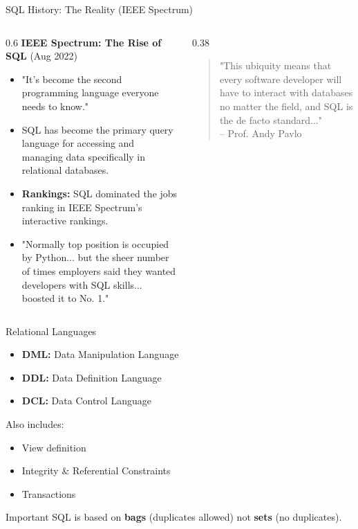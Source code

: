 \documentclass[aspectratio=169]{beamer}
\begin{document}
\begin{frame}{SQL History: The Reality (IEEE Spectrum)}
    \begin{columns}
        \begin{column}{0.6\textwidth}
           \textbf{IEEE Spectrum: The Rise of SQL} (Aug 2022)
           \begin{itemize}
               \item "It's become the second programming language everyone needs to know."
               \item SQL has become the primary query language for accessing and managing data specifically in relational databases.
               \item \textbf{Rankings:} SQL dominated the jobs ranking in IEEE Spectrum's interactive rankings.
               \item "Normally top position is occupied by Python... but the sheer number of times employers said they wanted developers with SQL skills... boosted it to No. 1."
           \end{itemize}
        \end{column}
        \begin{column}{0.38\textwidth}
            \begin{quote}
                "This ubiquity means that every software developer will have to interact with databases no matter the field, and SQL is the de facto standard..."
                \\ -- Prof. Andy Pavlo
            \end{quote}
        \end{column}
    \end{columns}
\end{frame}

\begin{frame}{Relational Languages}
    \begin{itemize}
        \item \textbf{DML:} Data Manipulation Language
        \item \textbf{DDL:} Data Definition Language
        \item \textbf{DCL:} Data Control Language
    \end{itemize}
    Also includes:
    \begin{itemize}
        \item View definition
        \item Integrity \& Referential Constraints
        \item Transactions
    \end{itemize}
    \begin{alertblock}{Important}
    SQL is based on \textbf{bags} (duplicates allowed) not \textbf{sets} (no duplicates).
    \end{alertblock}
\end{frame}
\end{document}
